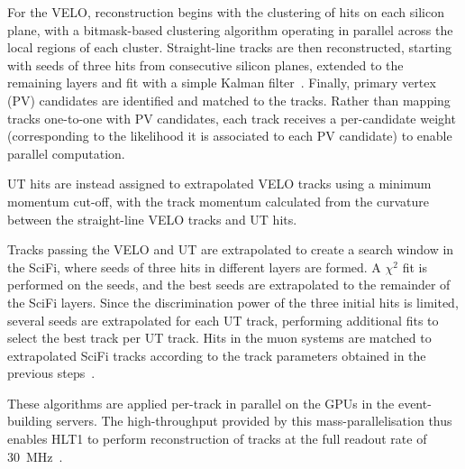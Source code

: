 For the VELO, reconstruction begins with the clustering of hits on each silicon plane, with a bitmask-based clustering algorithm operating in parallel across the local regions of each cluster. Straight-line tracks are then reconstructed, starting with seeds of three hits from consecutive silicon planes, extended to the remaining layers and fit with a simple Kalman filter~\cite{kalman-track}. 
Finally, primary vertex (PV) candidates are identified and matched to the tracks. Rather than mapping tracks one-to-one with PV candidates, each track receives a per-candidate weight (corresponding to the likelihood it is associated to each PV candidate) to enable parallel computation. 

UT hits are instead assigned to extrapolated VELO tracks using a minimum momentum cut-off, with the track momentum calculated from the curvature between the straight-line VELO tracks and UT hits. 

Tracks passing the VELO and UT are extrapolated to create a search window in the SciFi, where seeds of three hits in different layers are formed. A $\chi^2$ fit is performed on the seeds, and the best seeds are extrapolated to the remainder of the SciFi layers. Since the discrimination power of the three initial hits is limited, several seeds are extrapolated for each UT track, performing additional fits to select the best track per UT track. Hits in the muon systems are matched to extrapolated SciFi tracks according to the track parameters obtained in the previous steps~\cite{LHCb:2023hlw, LHCb_Allen_GPU}.

These algorithms are applied per-track in parallel on the GPUs in the event-building servers. The high-throughput provided by this mass-parallelisation thus enables HLT1 to perform reconstruction of tracks at the full readout rate of \SI{30}{\mega\hertz}~\cite{LHCb_Allen_GPU}.



